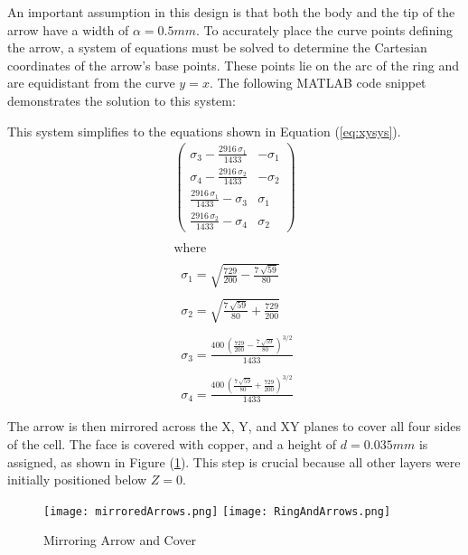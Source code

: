        An important assumption in this design is that both the body and the 
        tip of the arrow have a width of $\alpha=0.5 mm$. To accurately place
        the curve points defining the arrow, a system of equations must be 
        solved to determine the Cartesian coordinates of the arrow's base points. 
        These points lie on the arc of the ring and are equidistant from the curve 
        $y=x$. The following MATLAB code snippet demonstrates the solution to this 
        system:
        
        This system simplifies to the equations shown in Equation (\ref{eq:xysys}).
        \begin{equation}
            \label{eq:xysys}
            \displaystyle \begin{array}{l} 
                \left(\begin{array}{cc} 
                    \sigma_3 -\frac{2916\,\sigma_1 }{1433} & -\sigma_1 \\
                    \sigma_4 -\frac{2916\,\sigma_2 }{1433} & -\sigma_2 \\
                    \frac{2916\,\sigma_1 }{1433}-\sigma_3  & \sigma_1 \\
                    \frac{2916\,\sigma_2 }{1433}-\sigma_4  & \sigma_2  
                \end{array}\right)\\
                \mathrm{}\\
                \textrm{where}\\
                \mathrm{}\\
                \;\;\sigma_1 =\sqrt{\frac{729}{200}-\frac{7\,\sqrt{59}}{80}}\\
                \mathrm{}\\
                \;\;\sigma_2 =\sqrt{\frac{7\,\sqrt{59}}{80}+\frac{729}{200}}\\
                \mathrm{}\\
                \;\;\sigma_3 =\frac{400\,{{\left(\frac{729}{200}-\frac{7\,\sqrt{59}}{80}\right)}}^{3/2} }{1433}\\
                \mathrm{}\\
                \;\;\sigma_4 =\frac{400\,{{\left(\frac{7\,\sqrt{59}}{80}+\frac{729}{200}\right)}}^{3/2} }{1433}
            \end{array}
        \end{equation}

        The arrow is then mirrored across the X, Y, and XY planes to cover all
        four sides of the cell. The face is covered with copper, and a height of 
        $d=0.035 mm$ is assigned, as shown in Figure (\ref{img:mirrorAndCover}).
        This step is crucial because all other layers were initially positioned 
        below $Z=0$.
        \begin{figure}[h]
            \centering
            \texttt{[image: mirroredArrows.png]}\hfil
            \texttt{[image: RingAndArrows.png]}
            \caption{Mirroring Arrow and Cover}
            \label{img:mirrorAndCover}
        \end{figure}

